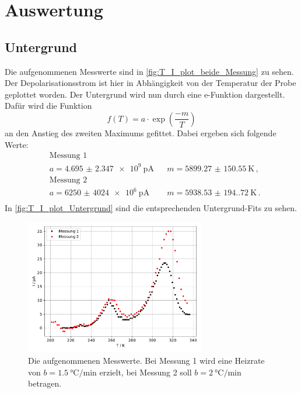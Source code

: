 \section{Auswertung}
\label{sec:Auswertung}

\subsection{Untergrund}
  Die aufgenommenen Messwerte sind in \autoref{fig:T_I_plot_beide_Messung} zu sehen.
  Der Depolarisationsstrom ist hier in Abhängigkeit von der Temperatur der Probe geplottet worden.
  Der Untergrund wird nun durch eine e-Funktion dargestellt.
  Dafür wird die Funktion
  \begin{equation*}
    f(T) = a \cdot \exp(\frac{-m}{T})
  \end{equation*}
  an den Anstieg des zweiten Maximums gefittet.
  Dabei ergeben sich folgende Werte:
  \begin{align*}
    &\text{Messung 1}\\
    &a =  \SI{4.695(2347)e9}{\pico\ampere} &&  m = \SI{5899.27(15055)}{\kelvin} \, ,\\
    &\text{Messung 2}\\
    &a = \SI{6250(4024)e6}{\pico\ampere} &&  m = \SI{5938.53(194.72)}{\kelvin} \, .\\ %
  \end{align*}
  In \autoref{fig:T_I_plot_Untergrund} sind die entsprechenden Untergrund-Fits zu sehen.

  \begin{figure}[H]
    \centering
    \includegraphics[width = 0.7\textwidth]{build/plot.pdf}
    \caption{Die aufgenommenen Messwerte. Bei Messung 1 wird eine Heizrate von $b = \SI{1.5}{\celsius\per\minute}$ erzielt, 
    bei Messung 2 soll $b = \SI{2}{\celsius\per\minute}$ betragen.}
    \label{fig:T_I_plot_beide_Messung}
  \end{figure} %

